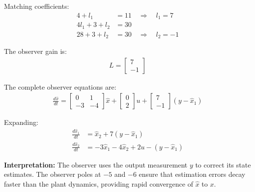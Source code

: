 \documentclass[11pt,a4paper]{article}
\begin{document}
Matching coefficients:
\begin{align}
  4 + l_1 &= 11 \quad \Rightarrow \quad l_1 = 7 \\
  4l_1 + 3 + l_2 &= 30 \\
  28 + 3 + l_2 &= 30 \quad \Rightarrow \quad l_2 = -1
\end{align}

The observer gain is:
\begin{align}
  L = \begin{bmatrix} 7 \\ -1 \end{bmatrix}
\end{align}

The complete observer equations are:
\begin{align}
  \frac{d\hat{x}}{dt} = \begin{bmatrix} 0 & 1 \\ -3 & -4 \end{bmatrix}\hat{x} + \begin{bmatrix} 0 \\ 2 \end{bmatrix}u + \begin{bmatrix} 7 \\ -1 \end{bmatrix}(y - \hat{x}_1)
\end{align}

Expanding:
\begin{align}
  \frac{d\hat{x}_1}{dt} &= \hat{x}_2 + 7(y - \hat{x}_1) \\
  \frac{d\hat{x}_2}{dt} &= -3\hat{x}_1 - 4\hat{x}_2 + 2u - (y - \hat{x}_1)
\end{align}

\textbf{Interpretation:} The observer uses the output measurement $y$ to correct its state estimates. The observer poles at $-5$ and $-6$ ensure that estimation errors decay faster than the plant dynamics, providing rapid convergence of $\hat{x}$ to $x$.
\end{document}

